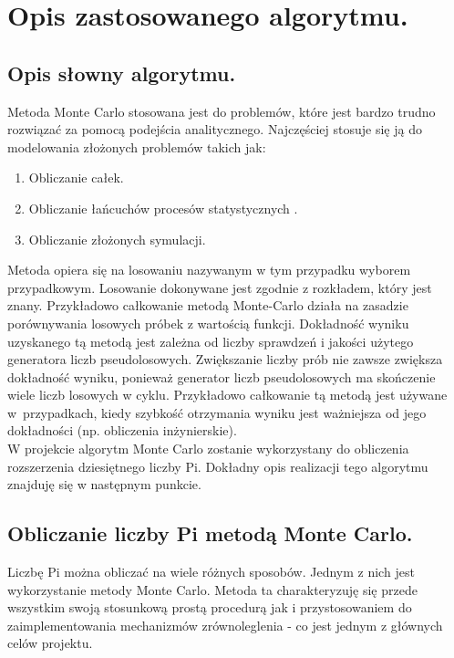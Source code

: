 \documentclass[a4paper,12pt]{article}		%
\begin{document}
\section{Opis zastosowanego algorytmu.}

\subsection{Opis słowny algorytmu.}
Metoda Monte Carlo stosowana jest do problemów, które jest bardzo trudno rozwiązać za pomocą podejścia analitycznego. Najczęściej stosuje się ją do modelowania złożonych problemów takich jak:
 
\begin{enumerate}
\item Obliczanie całek.
\item Obliczanie łańcuchów procesów statystycznych .
\item Obliczanie złożonych symulacji.
\end{enumerate}

Metoda opiera się na losowaniu nazywanym w tym przypadku wyborem przypadkowym. Losowanie dokonywane jest zgodnie z rozkładem, który jest znany. Przykładowo całkowanie metodą Monte-Carlo działa na zasadzie porównywania losowych próbek z wartością funkcji. Dokładność wyniku uzyskanego tą metodą jest zależna od liczby sprawdzeń i jakości użytego generatora liczb pseudolosowych. Zwiększanie liczby prób nie zawsze zwiększa dokładność wyniku, ponieważ generator liczb pseudolosowych ma skończenie wiele liczb losowych w cyklu. Przykładowo całkowanie tą metodą jest używane w~przypadkach, kiedy szybkość otrzymania wyniku jest ważniejsza od jego dokładności (np. obliczenia inżynierskie).\\

W projekcie algorytm Monte Carlo zostanie wykorzystany do obliczenia rozszerzenia dziesiętnego liczby Pi. Dokładny opis realizacji tego algorytmu znajduję się w następnym punkcie.

\subsection{Obliczanie liczby Pi metodą Monte Carlo.} 
Liczbę Pi można obliczać na wiele różnych sposobów. Jednym z nich jest wykorzystanie metody Monte Carlo. Metoda ta charakteryzuję się przede wszystkim swoją stosunkową prostą procedurą jak i przystosowaniem do zaimplementowania mechanizmów zrównoleglenia - co jest jednym z głównych celów projektu.
\end{document}
